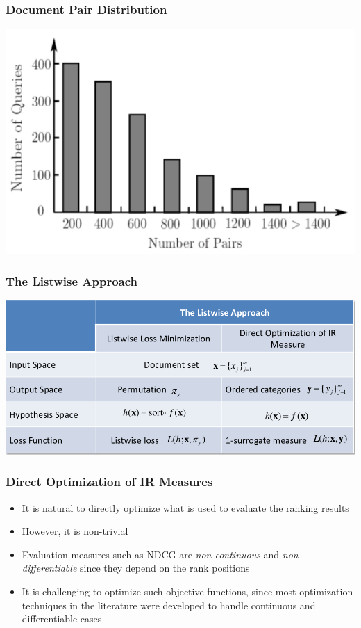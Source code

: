 \documentclass{beamer}
\begin{document}
\begin{frame}
    \frametitle{Document Pair Distribution}
    \centering
    \includegraphics[width=\linewidth]{pair_distribution}
\end{frame}

\begin{frame}
    \frametitle{The Listwise Approach}
    \centering
    \includegraphics[width=\linewidth]{listwise}
\end{frame}

\begin{frame}
    \frametitle{Direct Optimization of IR Measures}
    \begin{itemize}
    \item It is natural to directly optimize what is used to evaluate the
        ranking results
    \item However, it is non-trivial
    \item Evaluation measures such as NDCG are \emph{non-continuous} and
        \emph{non-differentiable} since they depend on the rank positions
    \item It is challenging to optimize such objective functions, since most
        optimization techniques in the literature were developed to handle
        continuous and differentiable cases
    \end{itemize}
\end{frame}
\end{document}
